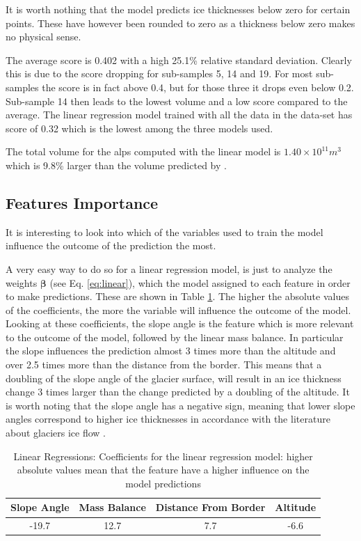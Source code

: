 It is worth nothing that the model predicts ice thicknesses below zero for certain points. These have however been rounded to zero as a thickness below zero makes no physical sense.

The average score is 0.402 with a high 25.1\% relative standard deviation. Clearly this is due to the score dropping for sub-samples 5, 14 and 19. For most sub-samples the score is in fact above 0.4, but for those three it drops even below 0.2. Sub-sample 14 then leads to the lowest volume and a low score compared to the average.
The linear regression model trained with all the data in the data-set has score of 0.32 which  is the lowest among the three models used.

The total volume for the alps computed with the linear model is $1.40 \times 10^{11}m^3$ which is 9.8\% larger than the volume predicted by \citet{Farinotti2019}.

\subsection{Features Importance}  

It is interesting to look into which of the variables used to train the model influence the outcome of the prediction the most.

A very easy way to do so for a linear regression model, is just to analyze the weights $\bm{\beta}$ (see Eq. \ref{eq:linear}), which the model assigned to each feature in order to make predictions. These are shown in Table \ref{tb:lr-coef}.
The higher the absolute values of the coefficients, the more the variable will influence the outcome of the model. Looking at these coefficients, the slope angle is the feature which is more relevant to the outcome of the model, followed by the linear mass balance. In particular the slope influences the prediction almost 3 times more than the altitude and over 2.5 times more than the distance from the border. This means that a doubling of the slope angle of the glacier surface, will result in an ice thickness change 3 times larger than the change predicted by a doubling of the altitude. It is worth noting that the slope angle has a negative sign, meaning that lower slope angles correspond to higher ice thicknesses in accordance with the literature about glaciers ice flow \cite[P. 298]{cuffey2010physics}.

\begin{table}
	\centering
	\caption{Linear Regressions: Coefficients for the linear regression model: higher absolute values mean that the feature have a higher influence on the model predictions}
	\begin{tabular}{|c|c|c|c|}
		\hline 
		Slope Angle&Mass Balance&Distance From Border&Altitude \\
		\hline
		-19.7&12.7&7.7&-6.6 \\
		\hline
	\end{tabular}
	\label{tb:lr-coef}
\end{table}


